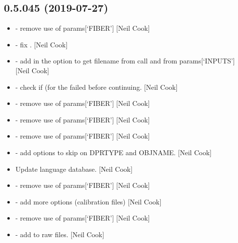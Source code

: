 \documentclass[a4paper,10pt,english]{report}
\begin{document}
\subsection{0.5.045 (2019-07-27)}
\label{\detokenize{misc/changelog:id98}}\begin{itemize}
\item {} 
 - remove use of params{[}‘FIBER’{]} {[}Neil
Cook{]}

\item {} 
 - fix . {[}Neil Cook{]}

\item {} 
 - add in the option to get filename from call and from
params{[}‘INPUTS’{]} {[}Neil Cook{]}

\item {} 
 - check if  (for the 
failed before continuing. {[}Neil Cook{]}

\item {} 
 - remove use of params{[}‘FIBER’{]} {[}Neil Cook{]}

\item {} 
 - remove use of params{[}‘FIBER’{]} {[}Neil Cook{]}

\item {} 
 - remove use of params{[}‘FIBER’{]} {[}Neil Cook{]}

\item {} 
 - add options to skip on DPRTYPE and OBJNAME.
{[}Neil Cook{]}

\item {} 
Update language database. {[}Neil Cook{]}

\item {} 
 - remove use of params{[}‘FIBER’{]} {[}Neil Cook{]}

\item {} 
 - add more options (calibration files) {[}Neil
Cook{]}

\item {} 
 - remove use of params{[}‘FIBER’{]} {[}Neil Cook{]}

\item {} 
 - add  to raw files. {[}Neil Cook{]}


\end{itemize}
\end{document}
